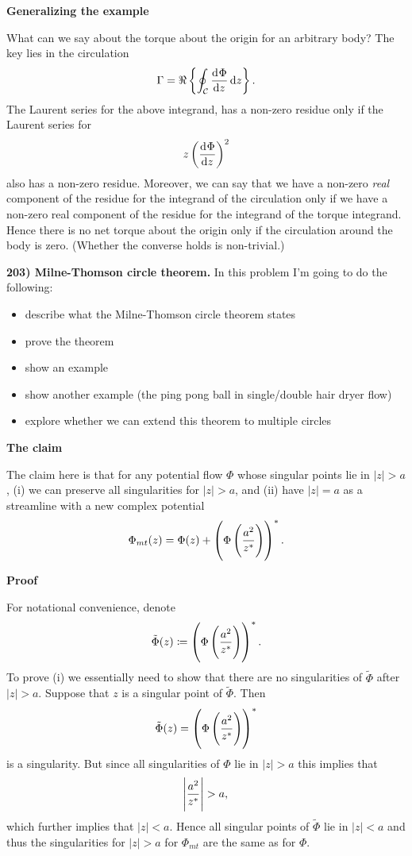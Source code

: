 \documentclass{article}
\def\ti#1{\tilde{#1}}
\newcommand{\fC}{\mathcal{C}} %
\begin{document}
\textbf{Generalizing the example}

What can we say about the torque about the origin for an arbitrary body?
The key lies in the circulation
%
\begin{equation*}
    \Gamma = \Re \cbr{\oint_\fC \dod{\Phi}{z} \dif z}
    .
\end{equation*}
%
The Laurent series for the above integrand, has a non-zero residue only if
the Laurent series for
%
\begin{equation*}
    z \del{\dod{\Phi}{z}}^2
\end{equation*}
%
also has a non-zero residue. Moreover, we can say that we have a non-zero
\textit{real} component of the residue for the integrand of the
circulation only if we have a non-zero real component of the
residue for the integrand of the torque integrand. Hence there is no net
torque about the origin only if the circulation around the body
is zero. (Whether the converse holds is non-trivial.)

\newpage

\textbf{203) Milne-Thomson circle theorem.}
In this problem I'm going to do the following:
%
\begin{itemize}
    \item describe what the Milne-Thomson circle theorem states
    \item prove the theorem
    \item show an example
    \item show another example (the ping pong ball in single/double hair dryer flow)
    \item explore whether we can extend this theorem to multiple circles
\end{itemize}

\textbf{The claim}

The claim here is that for any potential flow $\Phi$ whose singular
points lie in $|z| > a$, (i) we can preserve all singularities for $|z|
> a$, and (ii) have $|z| = a$ as a streamline with a new complex
potential
%
\begin{equation*}
    \Phi_{mt}(z) = \Phi(z) + \del{\Phi \del{\frac{a^2}{z^*}}}^*
    .
\end{equation*}

\textbf{Proof}

For notational convenience, denote
%
\begin{equation*}
    \ti{\Phi}(z) \coloneqq \del{\Phi \del{\frac{a^2}{z^*}}}^*
    .
\end{equation*}
%
To prove (i) we essentially need to show that there are no singularities
of $\ti\Phi$ after $|z| > a$. Suppose that $z$ is a singular point of
$\ti\Phi$. Then
%
\begin{equation*}
    \ti\Phi(z) = \del{\Phi \del{\frac{a^2}{z^*}}}^*
\end{equation*}
%
is a singularity. But since all singularities of $\Phi$ lie in $|z| >
a$ this implies that
%
\begin{equation*}
    \envert{\frac{a^2}{z^*}} > a
    ,
\end{equation*}
%
which further implies that $|z| < a$. Hence all singular points of
$\ti\Phi$ lie in $|z| < a$ and thus the singularities for $|z| > a$ for
$\Phi_{mt}$ are the same as for $\Phi$.
\end{document}
